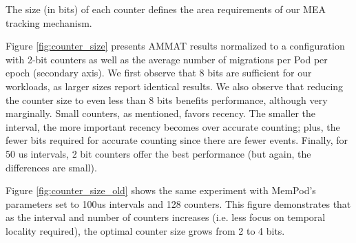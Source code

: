The size (in bits) of each counter defines the area requirements of our MEA tracking mechanism. 
Figure \ref{fig:counter_size} presents AMMAT results normalized to a configuration with 2-bit counters as well as the average number of migrations per Pod per epoch (secondary axis). We first observe that 8 bits are sufficient for our workloads, as larger sizes report identical results. We also observe that reducing the counter size to even less than 8 bits benefits performance,
although very marginally.  Small counters, as mentioned, favors recency.
The smaller the interval, the more important recency becomes over accurate
counting; plus, the fewer bits required for accurate counting since there
are fewer events.
Finally, for 50 us intervals, 2 bit counters offer the best performance
(but again, the differences are small).

Figure \ref{fig:counter_size_old} shows the same experiment with MemPod's parameters set to 100us intervals and 128 counters. This figure demonstrates that as the interval and number of counters increases (i.e. less focus on temporal locality required), the optimal counter size grows from 2 to 4 bits.

